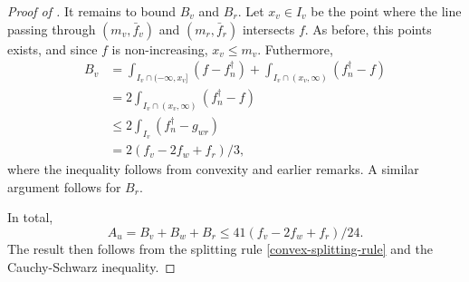 \begin{proof}[Proof of ]
  It remains to bound $B_v$ and $B_r$. Let $x_v \in I_v$ be the point
  where the line passing through $(m_v, \bar{f}_v)$ and
  $(m_r, \bar{f}_r)$ intersects $f$. As before, this points exists,
  and since $f$ is non-increasing, $x_v \le m_v$. Futhermore,
  \begin{align*}
    B_v &= \int_{I_v \cap (-\infty, x_v]} (f - f^\dagger_n) + \int_{I_v \cap (x_v, \infty)} (f^\dagger_n - f) \\
        &= 2 \int_{I_v \cap (x_v, \infty)} (f^\dagger_n - f) \\
        &\le 2 \int_{I_v} (f^\dagger_n - g_{wr}) \\
        &= 2(f_v - 2f_w + f_r)/3 ,
  \end{align*}
  where the inequality follows from convexity and earlier remarks. A
  similar argument follows for $B_r$.

  In total,
  \[
    A_u = B_v + B_w + B_r \le 41(f_v - 2 f_w + f_r)/24 .
  \]
  The result then follows from the splitting rule
  \eqref{convex-splitting-rule} and the Cauchy-Schwarz inequality.
\end{proof}

